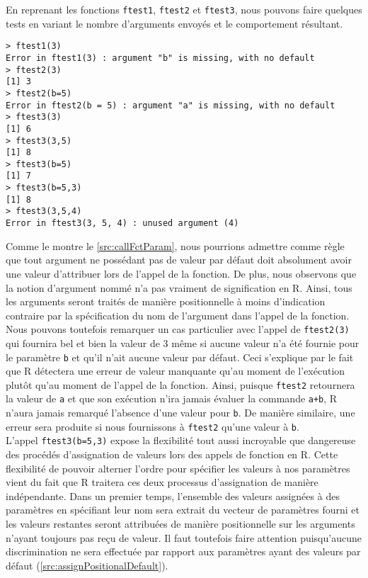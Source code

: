 En reprenant les fonctions \texttt{ftest1}, \texttt{ftest2} et \texttt{ftest3}, nous pouvons faire quelques tests en variant le nombre d'arguments envoyés et le comportement résultant.

\begin{lstlisting}[caption = Passage d'arguments à une fonction,label=src:callFctParam]
> ftest1(3)
Error in ftest1(3) : argument "b" is missing, with no default
> ftest2(3)
[1] 3
> ftest2(b=5)
Error in ftest2(b = 5) : argument "a" is missing, with no default
> ftest3(3)
[1] 6
> ftest3(3,5)
[1] 8
> ftest3(b=5)
[1] 7
> ftest3(b=5,3)
[1] 8
> ftest3(3,5,4)
Error in ftest3(3, 5, 4) : unused argument (4)
\end{lstlisting}

\vspace{\baselineskip}
Comme le montre le \autoref{src:callFctParam}, nous pourrions admettre comme règle que tout argument ne possédant pas de valeur par défaut doit absolument avoir une valeur d'attribuer lors de l'appel de la fonction. De plus, nous observons que la notion d'argument nommé n'a pas vraiment de signification en R. Ainsi, tous les arguments seront traités de manière positionnelle à moins d'indication contraire par la spécification du nom de l'argument dans l'appel de la fonction. Nous pouvons toutefois remarquer un cas particulier avec l'appel de \texttt{ftest2(3)} qui fournira bel et bien la valeur de 3 même si aucune valeur n'a été fournie pour le paramètre \texttt{b} et qu'il n'ait aucune valeur par défaut. Ceci s'explique par le fait que R détectera une erreur de valeur manquante qu'au moment de l'exécution plutôt qu'au moment de l'appel de la fonction. Ainsi, puisque \texttt{ftest2} retournera la valeur de \texttt{a} et que son exécution n'ira jamais évaluer la commande \texttt{a+b}, R n'aura jamais remarqué l'absence d'une valeur pour \texttt{b}. De manière similaire, une erreur sera produite si nous fournissons à \texttt{ftest2} qu'une valeur à \texttt{b}. \\

L'appel \texttt{ftest3(b=5,3)} expose la flexibilité tout aussi incroyable que dangereuse des procédés d'assignation de valeurs lors des appels de fonction en R. Cette flexibilité de pouvoir alterner l'ordre pour spécifier les valeurs à nos paramètres vient du fait que R traitera ces deux processus d'assignation de manière indépendante. Dans un premier temps, l'ensemble des valeurs assignées à des paramètres en spécifiant leur nom sera extrait du vecteur de paramètres fourni et les valeurs restantes seront attribuées de manière positionnelle sur les arguments n'ayant toujours pas reçu de valeur. Il faut toutefois faire attention puisqu’aucune discrimination ne sera effectuée par rapport aux paramètres ayant des valeurs par défaut (\autoref{src:assignPositionalDefault}).

